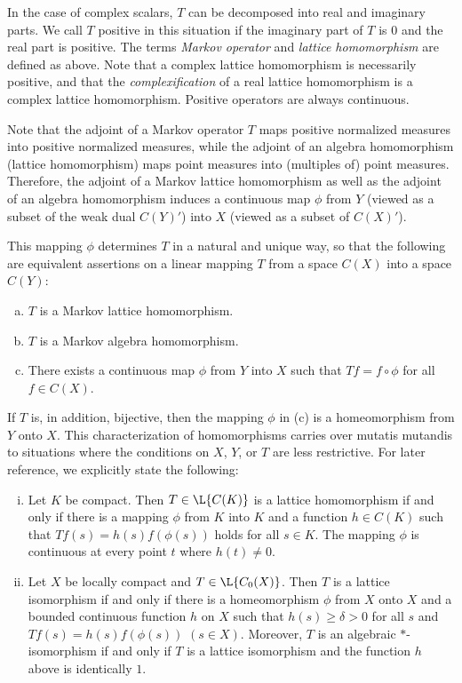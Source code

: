 In the case of complex scalars, $T$ can be decomposed into real and imaginary parts.
We call $T$ positive in this situation if the imaginary part of $T$ is $0$ and the real part is positive.
The terms \emph{Markov operator} and \emph{lattice homomorphism} are defined as above.
Note that a complex lattice homomorphism is necessarily positive, and that the \emph{complexification} of a real lattice homomorphism is a complex lattice homomorphism.
Positive operators are always continuous.

Note that the adjoint of a Markov operator $T$ maps positive normalized measures into positive normalized measures, while the adjoint of an algebra homomorphism (lattice homomorphism) maps point measures into (multiples of) point measures.
Therefore, the adjoint of a Markov lattice homomorphism as well as the adjoint of an algebra homomorphism induces a continuous map $\phi$ from $Y$ (viewed as a subset of the weak dual $C(Y)'$) into $X$ (viewed as a subset of $C(X)'$).

This mapping $\phi$ determines $T$ in a natural and unique way, so that the following are equivalent assertions on a linear mapping $T$ from a space $C(X)$ into a space $C(Y)$:

\begin{enumerate}[(a)]
\item 
	$T$ is a Markov lattice homomorphism.
\item 
	$T$ is a Markov algebra homomorphism.
\item 
	There exists a continuous map $\phi$ from $Y$ into $X$ such that $Tf = f \circ \phi$ for all $f \in C(X)$.
\end{enumerate}

If $T$ is, in addition, bijective, then the mapping $\phi$ in (c) is a homeomorphism from $Y$ onto $X$.
This characterization of homomorphisms carries over mutatis mutandis to situations where the conditions on $X$, $Y$, or $T$ are less restrictive.
For later reference, we explicitly state the following:

\begin{enumerate}[(i)]
\item 
	Let $K$ be compact. Then $T \in \L{C(K)}$ is a lattice homomorphism if and only if there is a mapping 
$\phi$ from $K$ into $K$ and a function $h \in C(K)$ such that $Tf(s) = h(s)f(\phi(s))$ holds for all $s \in K$.
The mapping $\phi$ is continuous at every point $t$ where $h(t) \neq 0$.

\item 
	Let $X$ be locally compact and $T \in \L{C_{0}(X)}$.
Then $T$ is a lattice isomorphism if and only if there is a homeomorphism $\phi$ from $X$ onto $X$ and a bounded continuous function $h$ on $X$ such that $h(s) \geq \delta > 0$ for all $s$ and $Tf(s) = h(s)f(\phi(s))$ $(s \in X)$.
Moreover, $T$ is an algebraic $*$-isomorphism if and only if $T$ is a lattice isomorphism and the function $h$ above is identically $1$.
\end{enumerate}
